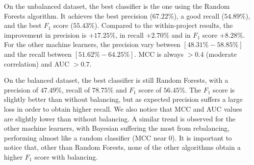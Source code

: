 On the unbalanced dataset, the best classifier is the one using the Random Forests algorithm. It achieves the best precision ($67.22\%$), a good recall ($54.89\%$), and the best $F_{1}$ score ($55.43\%$). Compared to the within-project results, the improvement in precision is $+17.25\%$, in recall $+2.70\%$ and in $F_1$ score $+8.28\%$. For the other machine learners, the precision vary between $[48.31\%-58.85\%]$ and the recall between $[51.62\%-64.25\%]$. MCC is always $>0.4$ (moderate correlation) and AUC $>0.7$.

On the balanced dataset, the best classifier is still Random Forests, with a precision of $47.49\%$, recall of $78.75\%$ and $F_{1}$ score of $56.45\%$. The $F_{1}$ score is slightly better than without balancing, but as expected precision suffers a large loss in order to obtain higher recall. We also notice that MCC and AUC values are slightly lower than without balancing. A similar trend is observed for the other machine learners, with Bayesian suffering the most from rebalancing, performing almost like a random classifier (MCC near $0$). It is important to notice that, other than Random Forests, none of the other algorithms obtain a higher $F_1$ score with balancing.

